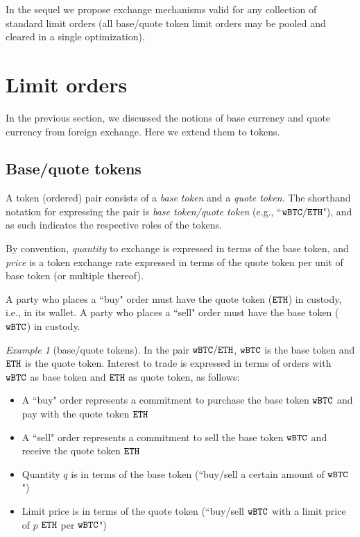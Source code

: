 \documentclass[11pt, reqno]{amsart}
\theoremstyle{definition}
\theoremstyle{remark}
\newtheorem{exmp}{Example}[subsection]
\newcommand{\BTC}{\textnormal{\texttt{wBTC}}}
\newcommand{\ETH}{\textnormal{\texttt{ETH}}}
\begin{document}
In the sequel we propose exchange mechanisms valid for any collection of
standard limit orders (all base/quote token limit orders may be pooled and
cleared in a single optimization).

\section{Limit orders}
In the previous section, we discussed the notions of base currency and
quote currency from foreign exchange. Here we extend them to tokens.

\subsection{Base/quote tokens}
A token (ordered) pair consists of a \emph{base token} and a
\emph{quote token}. The shorthand notation for expressing the pair is
\emph{base token/quote token} (e.g., ``$\BTC/\ETH$"), and as such indicates the
respective roles of the tokens.

By convention, \emph{quantity} to exchange is expressed in terms of the base
token, and \emph{price} is a token exchange rate expressed in terms of the
quote token per unit of base token (or multiple thereof).

A party who places a ``buy" order must have the quote token ($\ETH$) in custody,
i.e., in its wallet. A party who places a ``sell" order must have the base
token ($\BTC$) in custody.

\begin{exmp}[base/quote tokens]
In the pair $\BTC/\ETH$, $\BTC$ is the base token and $\ETH$
is the quote token. Interest to trade is expressed in terms of orders
with $\BTC$ as base token and $\ETH$ as quote token, as follows:
\begin{itemize}
    \item A ``buy" order represents a commitment to purchase the base token
          $\BTC$ and pay with the quote token $\ETH$
    \item A ``sell" order represents a commitment to sell the base token
          $\BTC$ and receive the quote token $\ETH$
    \item Quantity $q$ is in terms of the base token (``buy/sell a certain
          amount of $\BTC$")
    \item Limit price is in terms of the quote token (``buy/sell $\BTC$ with a
          limit price of $p$ $\ETH$ per $\BTC$")
\end{itemize}
\end{exmp}
\end{document}
